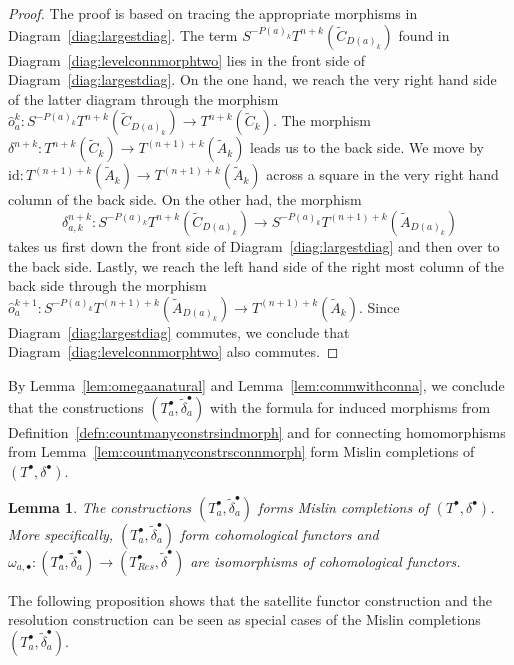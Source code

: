\documentclass[12pt,a4paper]{article}
\numberwithin{equation}{section}
\newtheorem{lem}[thm]{Lemma}
\theoremstyle{nonumberplain}
\newtheorem{proof}{Proof}
\begin{document}
\begin{proof}
The proof is based on tracing the appropriate morphisms in Diagram~\ref{diag:largestdiag}. The term $S^{-P(a)_k}T^{n+k}(\widetilde{C}_{D(a)_k})$ found in Diagram~\ref{diag:levelconnmorphtwo} lies in the front side of Diagram~\ref{diag:largestdiag}. On the one hand, we reach the very right hand side of the latter diagram through the morphism $\widehat{o}_a^k: S^{-P(a)_k}T^{n+k}(\widetilde{C}_{D(a)_k}) \rightarrow T^{n+k}(\widetilde{C}_k)$. The morphism $\delta^{n+k}: T^{n+k}(\widetilde{C}_k) \rightarrow T^{(n+1)+k}(\widetilde{A}_k)$ leads us to the back side. We move by $\mathrm{id}: T^{(n+1)+k}(\widetilde{A}_k) \rightarrow T^{(n+1)+k}(\widetilde{A}_k)$ across a square in the very right hand column of the back side. On the other had, the morphism
\[ \delta_{a, k}^{n+k}: S^{-P(a)_k}T^{n+k}(\widetilde{C}_{D(a)_k}) \rightarrow S^{-P(a)_k}T^{(n+1)+k}(\widetilde{A}_{D(a)_k}) \]
takes us first down the front side of Diagram~\ref{diag:largestdiag} and then over to the back side. Lastly, we reach the left hand side of the right most column of the back side through the morphism $\widehat{o}_a^{k+1}: S^{-P(a)_k}T^{(n+1)+k}(\widetilde{A}_{D(a)_k}) \rightarrow T^{(n+1)+k}(\widetilde{A}_k)$. Since Diagram~\ref{diag:largestdiag} commutes, we conclude that Diagram~\ref{diag:levelconnmorphtwo} also commutes.
\end{proof}

By Lemma~\ref{lem:omegaanatural} and Lemma~\ref{lem:commwithconna}, we conclude that the constructions $(T_a^{\bullet}, \widetilde{\delta}_a^{\bullet})$ with the formula for induced morphisms from Definition~\ref{defn:countmanyconstrsindmorph} and for connecting homomorphisms from Lemma~\ref{lem:countmanyconstrsconnmorph} form Mislin completions of $(T^{\bullet}, \delta^{\bullet})$.

\begin{lem}
The constructions $(T_a^{\bullet}, \widetilde{\delta}_a^{\bullet})$ forms Mislin completions of $(T^{\bullet}, \delta^{\bullet})$. More specifically, $(T_a^{\bullet}, \widetilde{\delta}_a^{\bullet})$  form cohomological functors and $\omega_{a, \bullet}: (T_a^{\bullet}, \widetilde{\delta}_a^{\bullet}) \rightarrow (T_{Res}^{\bullet}, \widetilde{\delta}^{\bullet})$ are isomorphisms of cohomological functors.
\end{lem}

The following proposition shows that the satellite functor construction and the resolution construction can be seen as special cases of the Mislin completions $(T_a^{\bullet}, \widetilde{\delta}_a^{\bullet})$.
\end{document}
